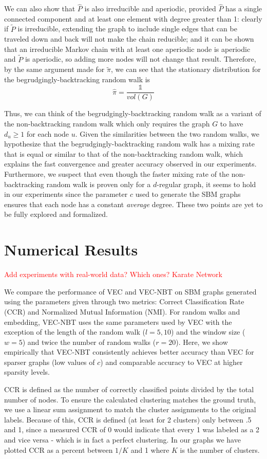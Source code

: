 \documentclass{article} %
\begin{document}
We can also show that $\hat P$ is also irreducible and aperiodic, provided $\hat P$ has a single connected component and at least one element with degree greater than 1: clearly if $\tilde P$ is irreducible, extending the graph to include single edges that can be traveled down and back will not make the chain reducible; and it can be shown that an irreducible Markov chain with at least one aperiodic node is aperiodic and $\tilde P$ is aperiodic, so adding more nodes will not change that result. Therefore, by the same argument made for $\tilde \pi$, we can see that the stationary distribution for the begrudgingly-backtracking random walk is
\[\hat \pi = \frac{\mathds{1}}{vol(G)}\]

Thus, we can think of the begrudgingly-backtracking random walk as a variant of the non-backtracking random walk which only requires the graph $G$ to have $d_u \geq 1$ for each node $u$. Given the similarities between the two random walks, we hypothesize that the begrudgingly-backtracking random walk has a mixing rate that is equal or similar to that of the non-backtracking random walk, which explains the fast convergence and greater accuracy observed in our experiments. Furthermore, we suspect that even though the faster mixing rate of the non-backtracking random walk is proven only for a $d$-regular graph, it seems to hold in our experiments since the parameter $c$ used to generate the SBM graphs ensures that each node has a constant \emph{average} degree. These two points are yet to be fully explored and formalized. 


\section{Numerical Results}
\textcolor{red}{Add experiments with real-world data? Which ones? Karate Network}

We compare the performance of VEC and VEC-NBT on SBM graphs generated using the parameters given through two metrics: Correct Classification Rate (CCR) and Normalized Mutual Information (NMI). For random walks and embedding, VEC-NBT uses the same parameters used by VEC with the exception of the length of the random walk ($l=5, 10$) and the window size ($w=5$) and twice the number of random walks ($r=20$). Here, we show empirically that VEC-NBT consistently achieves better accuracy than VEC for sparser graphs (low values of $c$) and comparable accuracy to VEC at higher sparsity levels.

CCR is defined as the number of correctly classified points divided by the total number of nodes. To ensure the calculated clustering matches the ground truth, we use a linear sum assignment to match the cluster assignments to the original labels. Because of this, CCR is defined (at least for 2 clusters) only between .5 and 1, since a measured CCR of 0 would indicate that every 1 was labeled as a 2 and vice versa - which is in fact a perfect clustering. In our graphs we have plotted CCR as a percent between $1/K$ and 1 where $K$ is the number of clusters.
\end{document}
